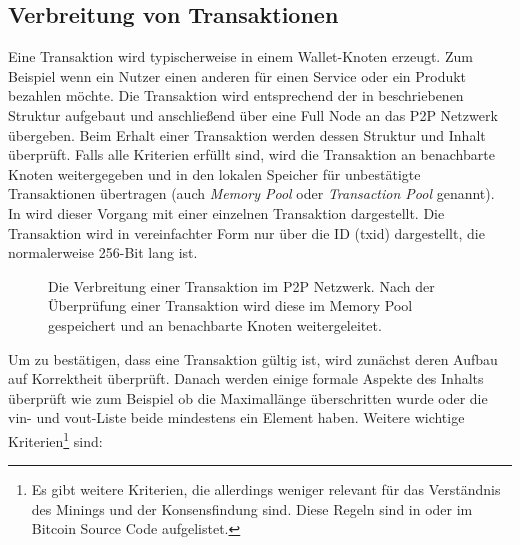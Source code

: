 \documentclass[ngerman,runningheads,a4paper]{llncs}[2018/03/10]
\begin{document}
\subsection{Verbreitung von Transaktionen}\label{sec:transaktionsverbreitung}

Eine Transaktion wird typischerweise in einem Wallet-Knoten erzeugt. Zum Beispiel wenn ein Nutzer einen anderen für einen Service oder ein Produkt bezahlen möchte. Die Transaktion wird entsprechend der in  beschriebenen Struktur aufgebaut und anschließend über eine Full Node an das P2P Netzwerk übergeben. Beim Erhalt einer Transaktion werden dessen Struktur und Inhalt überprüft. Falls alle Kriterien erfüllt sind, wird die Transaktion an benachbarte Knoten weitergegeben und in den lokalen Speicher für unbestätigte Transaktionen übertragen (auch \textit{Memory Pool} oder \textit{Transaction Pool} genannt). In  wird dieser Vorgang mit einer einzelnen Transaktion dargestellt. Die Transaktion wird in vereinfachter Form nur über die ID (txid) dargestellt, die normalerweise 256-Bit lang ist.

\begin{figure}
  \centering
  \caption{Die Verbreitung einer Transaktion im P2P Netzwerk. Nach der Überprüfung einer Transaktion wird diese im Memory Pool gespeichert und an benachbarte Knoten weitergeleitet.}
  \label{fig:transactionPropagation}
\end{figure}

Um zu bestätigen, dass eine Transaktion gültig ist, wird zunächst deren Aufbau auf Korrektheit überprüft. Danach werden einige formale Aspekte des Inhalts überprüft wie zum Beispiel ob die Maximallänge überschritten wurde oder die vin- und vout-Liste beide mindestens ein Element haben. Weitere wichtige Kriterien\footnote{Es gibt weitere Kriterien, die allerdings weniger relevant für das Verständnis des Minings und der Konsensfindung sind. Diese Regeln sind in \citep{bitcoinbook} oder im Bitcoin Source Code \citep{bitcoincore} aufgelistet.} sind:
\end{document}
